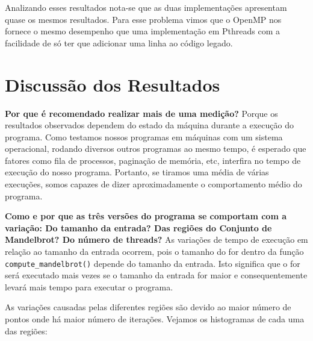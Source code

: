 \documentclass[12pt]{article}
\newcommand{\code}[1]{\texttt{#1}}
\begin{document}
Analizando esses resultados nota-se que as duas implementações apresentam quase os mesmos resultados. Para esse problema vimos que o OpenMP nos fornece o mesmo desempenho que uma implementação em Pthreads com a facilidade de só ter que adicionar uma linha ao código legado.

\newpage
\section{Discussão dos Resultados}
{\bf Por que é recomendado realizar mais de uma medição?} 
    Porque os resultados observados dependem do estado da máquina
    durante a execução do programa. Como testamos nossos programas
    em máquinas com um sistema operacional, rodando diversos outros
    programas ao mesmo tempo, é esperado que fatores como fila de
    processos, paginação de memória, etc, interfira no tempo de 
    execução do nosso programa. Portanto, se tiramos uma média
    de várias execuções, somos capazes de dizer aproximadamente
    o comportamento médio do programa.

{\bf Como e por que as três versões do programa se comportam com a variação: Do tamanho da entrada? Das regiões do Conjunto de Mandelbrot? Do número de threads?}
As variações de tempo de execução em relação ao tamanho da entrada ocorrem, pois o tamanho do for dentro da função \code{compute\_mandelbrot()} depende do tamanho da entrada. Isto significa que o for será executado mais vezes se o tamanho da entrada for maior e consequentemente levará mais tempo para executar o programa.

As variações causadas pelas diferentes regiões são devido ao maior número de pontos onde há maior número de iterações. Vejamos os histogramas de cada uma das regiões:

\begin{figure}[H]
\end{figure}
\end{document}
